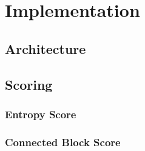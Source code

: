\chapter{Implementation}
\label{chap:impl}

	\section{Architecture}
	
	\section{Scoring}
	
		\subsection{Entropy Score}
		
		\subsection{Connected Block Score}
